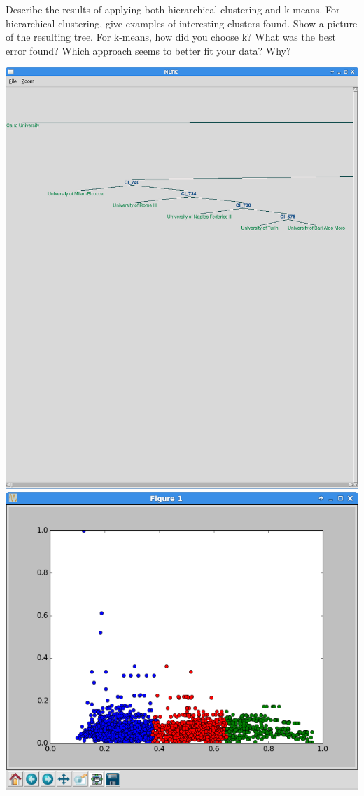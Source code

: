 \documentclass[11pt]{article}
\begin{document}
Describe the results of applying both hierarchical clustering and
k-means.  For hierarchical clustering, give examples of interesting
clusters found.  Show a picture of the resulting tree.  For k-means,
how did you choose k?  What was the best error found?  Which approach
seems to better fit your data? Why?
\begin{center}
 \includegraphics[scale=0.5]{hierarchical}
 \\ \includegraphics[scale=0.7]{kmeans}
\end{center}
\end{document}
